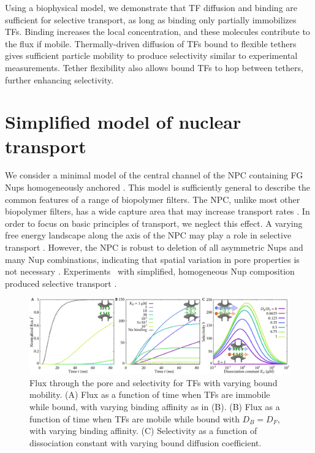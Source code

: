 Using a biophysical model, we demonstrate that TF diffusion and
binding are sufficient for selective transport, as long as binding
only partially immobilizes TFs. Binding increases the local
concentration, and these molecules contribute to the flux if mobile.
Thermally-driven diffusion of TFs bound to flexible tethers gives
sufficient particle mobility to produce selectivity similar to
experimental measurements.  Tether flexibility also allows bound TFs
to hop between tethers, further enhancing selectivity.

\section{Simplified model of nuclear transport}

We consider a minimal model of the central channel of the NPC
containing FG Nups homogeneously anchored .  This
model is sufficiently general to describe the common features of a
range of biopolymer filters.  The NPC, unlike most other biopolymer
filters, has a wide capture area that may increase transport rates
\cite{pagliara14}.  In order to focus on basic principles of
transport, we neglect this effect.  A varying free energy landscape
along the axis of the NPC may play a role in selective transport
\cite{zilman07, tagliazucchi13, tu13, timney16}.  However, the NPC is
robust to deletion of all asymmetric Nups and many Nup combinations,
indicating that spatial variation in pore properties is not necessary
\cite{strawn04, zeitler04}.  Experiments \vitro\ with simplified,
homogeneous Nup composition produced selective transport
\cite{kowalczyk11, jovanovic-talisman09}.

\begin{figure}[t!]
\centering
\includegraphics[width=\textwidth]{figs/ch02/fig2.pdf}
\caption{Flux through the pore and selectivity for TFs with varying
  bound mobility. (A) Flux as a function of time when TFs are immobile
  while bound, with varying binding affinity as in (B).  (B) Flux as a function
  of time when TFs are mobile while bound with $D_B = D_F$, with
  varying binding affinity.  (C) Selectivity as a function of
  dissociation constant with varying bound diffusion coefficient. }
\label{fig:transient}
\end{figure}

